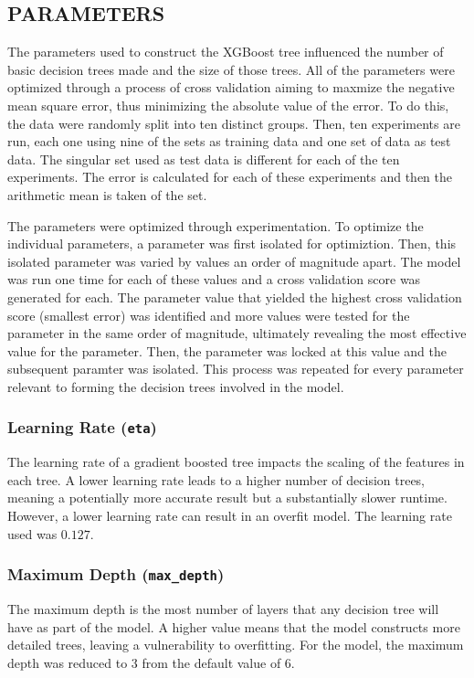 \documentclass[12pt]{article}
\newcommand{\code}{\texttt}
\begin{document}
    \subsection{PARAMETERS}
      The parameters used to construct the XGBoost tree influenced the number of basic decision trees made and the size of those trees. All of the parameters were optimized through a process of cross validation aiming to maxmize the negative mean square error, thus minimizing the absolute value of the error. To do this, the data were randomly split into ten distinct groups. Then, ten experiments are run, each one using nine of the sets as training data and one set of data as test data. The singular set used as test data is different for each of the ten experiments. The error is calculated for each of these experiments and then the arithmetic mean is taken of the set.

      The parameters were optimized through experimentation. To optimize the individual parameters, a parameter was first isolated for optimiztion. Then, this isolated parameter was varied by values an order of magnitude apart. The model was run one time for each of these values and a cross validation score was generated for each. The parameter value that yielded the highest cross validation score (smallest error) was identified and more values were tested for the parameter in the same order of magnitude, ultimately revealing the most effective value for the parameter. Then, the parameter was locked at this value and the subsequent paramter was isolated. This process was repeated for every parameter relevant to forming the decision trees involved in the model.
      \subsubsection{Learning Rate (\code{eta})}
        The learning rate of a gradient boosted tree impacts the scaling of the features in each tree. A lower learning rate leads to a higher number of decision trees, meaning a potentially more accurate result but a substantially slower runtime. However, a lower learning rate can result in an overfit model. The learning rate used was $0.127$.
      \subsubsection{Maximum Depth (\code{max\_depth})}
        The maximum depth is the most number of layers that any decision tree will have as part of the model. A higher value means that the model constructs more detailed trees, leaving a vulnerability to overfitting. For the model, the maximum depth was reduced to 3 from the default value of 6.
\end{document}
